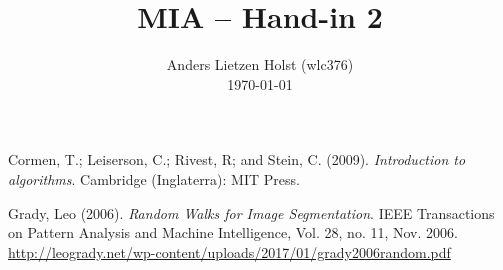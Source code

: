 \documentclass[a4paper,12pt]{article}
\title{\large MIA -- Hand-in 2}
\author{{\footnotesize Anders Lietzen Holst (wlc376)}\\ {\footnotesize \today}}
\date{}
\begin{document}


\maketitle







\begin{thebibliography}{8}

    Cormen, T.; Leiserson, C.; Rivest, R; and Stein, C. (2009).
    \textit{Introduction to algorithms}. Cambridge (Inglaterra): MIT Press.


    Grady, Leo (2006). \textit{Random Walks for Image Segmentation}.
    IEEE Transactions on Pattern Analysis and Machine Intelligence, Vol. 28, no.
    11, Nov. 2006.\\
    \url{http://leogrady.net/wp-content/uploads/2017/01/grady2006random.pdf}

\end{thebibliography}
\end{document}
